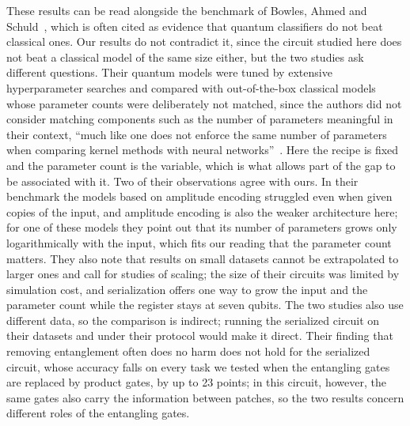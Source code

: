 \documentclass[11pt]{article}
\begin{document}
These results can be read alongside the benchmark of Bowles, Ahmed and Schuld~\cite{bowles2024better}, which is often cited as evidence that quantum classifiers do not beat classical ones. Our results do not contradict it, since the circuit studied here does not beat a classical model of the same size either, but the two studies ask different questions. Their quantum models were tuned by extensive hyperparameter searches and compared with out-of-the-box classical models whose parameter counts were deliberately not matched, since the authors did not consider matching components such as the number of parameters meaningful in their context, ``much like one does not enforce the same number of parameters when comparing kernel methods with neural networks''~\cite{bowles2024better}. Here the recipe is fixed and the parameter count is the variable, which is what allows part of the gap to be associated with it. Two of their observations agree with ours. In their benchmark the models based on amplitude encoding struggled even when given copies of the input, and amplitude encoding is also the weaker architecture here; for one of these models they point out that its number of parameters grows only logarithmically with the input, which fits our reading that the parameter count matters. They also note that results on small datasets cannot be extrapolated to larger ones and call for studies of scaling; the size of their circuits was limited by simulation cost, and serialization offers one way to grow the input and the parameter count while the register stays at seven qubits. The two studies also use different data, so the comparison is indirect; running the serialized circuit on their datasets and under their protocol would make it direct. Their finding that removing entanglement often does no harm does not hold for the serialized circuit, whose accuracy falls on every task we tested when the entangling gates are replaced by product gates, by up to 23 points; in this circuit, however, the same gates also carry the information between patches, so the two results concern different roles of the entangling gates.
\end{document}
